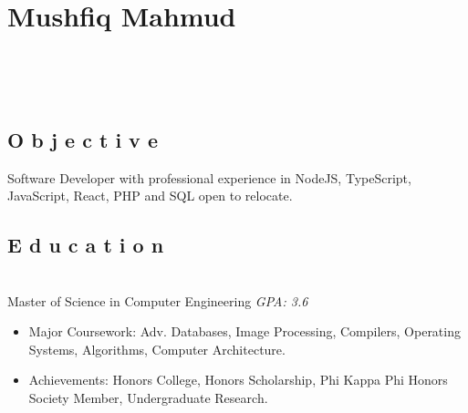 \documentclass[2pt]{resume}
\begin{document}
\section{Mushfiq Mahmud}

\begin{center}
	 \hspace{2mm}
	\address{Tampa, FL} \hspace{2mm}
	 \\
	\vspace{1mm}

	 \hspace{1mm}
	 \hspace{1mm}
	 \\
	\vspace{-3mm}
\end{center}


\subsection{O b j e c t i v e}
\small Software Developer with professional experience in NodeJS, TypeScript, JavaScript, React, PHP and SQL open to relocate.


\subsection{E d u c a t i o n}
 \\
Master of Science in Computer Engineering \hfill \emph{GPA: 3.6}

\begin{itemize}
\item \small Major Coursework: Adv. Databases, Image Processing, Compilers, Operating Systems, Algorithms, Computer Architecture.
\item \small Achievements: Honors College, Honors Scholarship, Phi Kappa Phi Honors Society Member, Undergraduate Research.
\end{itemize}

\end{document}
